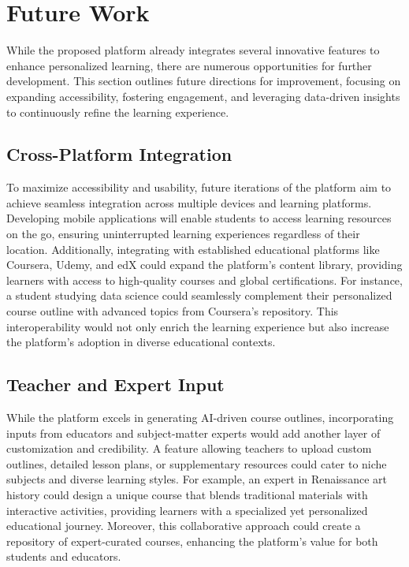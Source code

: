 \section{Future Work}
While the proposed platform already integrates several innovative features to enhance personalized learning, there are numerous opportunities for further development. This section outlines future directions for improvement, focusing on expanding accessibility, fostering engagement, and leveraging data-driven insights to continuously refine the learning experience.

\subsection{Cross-Platform Integration}
To maximize accessibility and usability, future iterations of the platform aim to achieve seamless integration across multiple devices and learning platforms. Developing mobile applications will enable students to access learning resources on the go, ensuring uninterrupted learning experiences regardless of their location. Additionally, integrating with established educational platforms like Coursera, Udemy, and edX could expand the platform's content library, providing learners with access to high-quality courses and global certifications. For instance, a student studying data science could seamlessly complement their personalized course outline with advanced topics from Coursera’s repository. This interoperability would not only enrich the learning experience but also increase the platform’s adoption in diverse educational contexts.

\subsection{Teacher and Expert Input}
While the platform excels in generating AI-driven course outlines, incorporating inputs from educators and subject-matter experts would add another layer of customization and credibility. A feature allowing teachers to upload custom outlines, detailed lesson plans, or supplementary resources could cater to niche subjects and diverse learning styles. For example, an expert in Renaissance art history could design a unique course that blends traditional materials with interactive activities, providing learners with a specialized yet personalized educational journey. Moreover, this collaborative approach could create a repository of expert-curated courses, enhancing the platform’s value for both students and educators.

